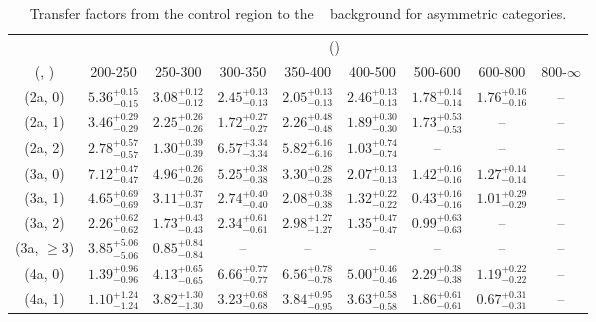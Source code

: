 \begin{table}[h!]
\tiny
\centering
\caption{Transfer factors from the \mmj control region to the \zInv~ background for asymmetric categories.\label{tab:tf_mumu_zinv_asym}}
\begin{tabular}
{ccccccccc}
	\hline\hline
	& \multicolumn{8}{c}{\scalht (\gev)} \\ 
	 (\njet,  \nb) & 200-250 & 250-300 & 300-350 & 350-400 & 400-500 & 500-600 & 600-800 & 800-$\infty$ \\ [0.8ex] 
\hline
	(2a, 0) & $5.36^{+ 0.15 }_{- 0.15 }$ & $3.08^{+ 0.12 }_{- 0.12 }$ & $2.45^{+ 0.13 }_{- 0.13 }$ & $2.05^{+ 0.13 }_{- 0.13 }$ & $2.46^{+ 0.13 }_{- 0.13 }$ & $1.78^{+ 0.14 }_{- 0.14 }$ & $1.76^{+ 0.16 }_{- 0.16 }$ & -- \\[0.5ex] 
	(2a, 1) & $3.46^{+ 0.29 }_{- 0.29 }$ & $2.25^{+ 0.26 }_{- 0.26 }$ & $1.72^{+ 0.27 }_{- 0.27 }$ & $2.26^{+ 0.48 }_{- 0.48 }$ & $1.89^{+ 0.30 }_{- 0.30 }$ & $1.73^{+ 0.53 }_{- 0.53 }$ & -- & -- \\[0.5ex] 
	(2a, 2) & $2.78^{+ 0.57 }_{- 0.57 }$ & $1.30^{+ 0.39 }_{- 0.39 }$ & $6.57^{+ 3.34 }_{- 3.34 }$ & $5.82^{+ 6.16 }_{- 6.16 }$ & $1.03^{+ 0.74 }_{- 0.74 }$ & -- & -- & -- \\[0.5ex] 
	(3a, 0) & $7.12^{+ 0.47 }_{- 0.47 }$ & $4.96^{+ 0.26 }_{- 0.26 }$ & $5.25^{+ 0.38 }_{- 0.38 }$ & $3.30^{+ 0.28 }_{- 0.28 }$ & $2.07^{+ 0.13 }_{- 0.13 }$ & $1.42^{+ 0.16 }_{- 0.16 }$ & $1.27^{+ 0.14 }_{- 0.14 }$ & -- \\[0.5ex] 
	(3a, 1) & $4.65^{+ 0.69 }_{- 0.69 }$ & $3.11^{+ 0.37 }_{- 0.37 }$ & $2.74^{+ 0.40 }_{- 0.40 }$ & $2.08^{+ 0.38 }_{- 0.38 }$ & $1.32^{+ 0.22 }_{- 0.22 }$ & $0.43^{+ 0.16 }_{- 0.16 }$ & $1.01^{+ 0.29 }_{- 0.29 }$ & -- \\[0.5ex] 
	(3a, 2) & $2.26^{+ 0.62 }_{- 0.62 }$ & $1.73^{+ 0.43 }_{- 0.43 }$ & $2.34^{+ 0.61 }_{- 0.61 }$ & $2.98^{+ 1.27 }_{- 1.27 }$ & $1.35^{+ 0.47 }_{- 0.47 }$ & $0.99^{+ 0.63 }_{- 0.63 }$ & -- & -- \\[0.5ex] 
	(3a, $\ge3$) & $3.85^{+ 5.06 }_{- 5.06 }$ & $0.85^{+ 0.84 }_{- 0.84 }$ & -- & -- & -- & -- & -- & -- \\[0.5ex] 
	(4a, 0) & $1.39^{+ 0.96 }_{- 0.96 }$ & $4.13^{+ 0.65 }_{- 0.65 }$ & $6.66^{+ 0.77 }_{- 0.77 }$ & $6.56^{+ 0.78 }_{- 0.78 }$ & $5.00^{+ 0.46 }_{- 0.46 }$ & $2.29^{+ 0.38 }_{- 0.38 }$ & $1.19^{+ 0.22 }_{- 0.22 }$ & -- \\[0.5ex] 
	(4a, 1) & $1.10^{+ 1.24 }_{- 1.24 }$ & $3.82^{+ 1.30 }_{- 1.30 }$ & $3.23^{+ 0.68 }_{- 0.68 }$ & $3.84^{+ 0.95 }_{- 0.95 }$ & $3.63^{+ 0.58 }_{- 0.58 }$ & $1.86^{+ 0.61 }_{- 0.61 }$ & $0.67^{+ 0.31 }_{- 0.31 }$ & -- \\[0.5ex] 

\end{tabular}
\end{table}
